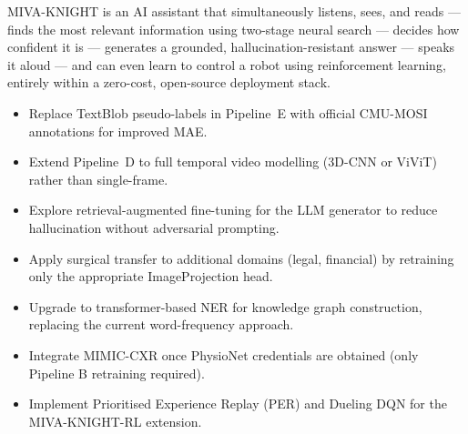 \documentclass[12pt,a4paper]{article}
\theoremstyle{definition}
\theoremstyle{plain}
\theoremstyle{remark}
\begin{document}
\begin{tcolorbox}[laymanbox,title={One-Sentence Summary}]
MIVA-KNIGHT is an AI assistant that simultaneously listens, sees, and reads --- finds the most relevant information using two-stage neural search --- decides how confident it is --- generates a grounded, hallucination-resistant answer --- speaks it aloud --- and can even learn to control a robot using reinforcement learning, entirely within a zero-cost, open-source deployment stack.
\end{tcolorbox}

\vfill
\begin{center}
\begin{tcolorbox}[keybox,width=0.85\textwidth,title={Future Directions}]
\begin{itemize}[nosep]
  \item Replace TextBlob pseudo-labels in Pipeline~E with official CMU-MOSI annotations for improved MAE.
  \item Extend Pipeline~D to full temporal video modelling (3D-CNN or ViViT) rather than single-frame.
  \item Explore retrieval-augmented fine-tuning for the LLM generator to reduce hallucination without adversarial prompting.
  \item Apply surgical transfer to additional domains (legal, financial) by retraining only the appropriate ImageProjection head.
  \item Upgrade to transformer-based NER for knowledge graph construction, replacing the current word-frequency approach.
  \item Integrate MIMIC-CXR once PhysioNet credentials are obtained (only Pipeline B retraining required).
  \item Implement Prioritised Experience Replay (PER) and Dueling DQN for the MIVA-KNIGHT-RL extension.
\end{itemize}
\end{tcolorbox}
\end{center}
\end{document}
